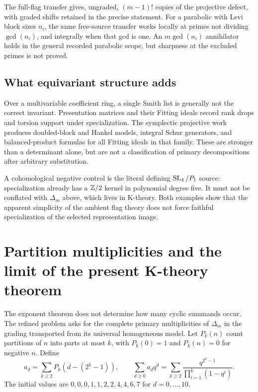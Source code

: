The full-flag transfer gives, ungraded, $(m-1)!$ copies of the projective defect, with graded shifts retained in the precise statement. For a parabolic with Levi block sizes $n_i$, the same free-source transfer works locally at primes not dividing $\gcd(n_i)$, and integrally when that gcd is one. An $m\gcd(n_i)$ annihilator holds in the general recorded parabolic scope, but sharpness at the excluded primes is not proved.

\subsection{What equivariant structure adds}
Over a multivariable coefficient ring, a single Smith list is generally not the correct invariant. Presentation matrices and their Fitting ideals record rank drops and torsion support under specialization. The symplectic projective work produces doubled-block and Hankel models, integral Schur generators, and balanced-product formulas for all Fitting ideals in that family. These are stronger than a determinant alone, but are not a classification of primary decompositions after arbitrary substitution.

A cohomological negative control is the literal defining $\operatorname{SL}_4/P_1$ source: specialization already has a $\mathbb Z/2$ kernel in polynomial degree five. It must not be conflated with $\Delta_m$ above, which lives in K-theory. Both examples show that the apparent simplicity of the ambient flag theory does not force faithful specialization of the selected representation image.


\section{Partition multiplicities and the limit of the present K-theory theorem}
The exponent theorem does not determine how many cyclic summands occur. The refined problem asks for the complete primary multiplicities of $\Delta_m$ in the grading transported from its universal homogeneous model. Let $P_k(n)$ count partitions of $n$ into parts at most $k$, with $P_k(0)=1$ and $P_k(n)=0$ for negative $n$. Define
\[
 a_d=\sum_{k\ge2}P_k(d-(2^k-1)),\qquad
 \sum_{d\ge0}a_dq^d=\sum_{k\ge2}\frac{q^{2^k-1}}{\prod_{i=1}^k(1-q^i)}.
\]
The initial values are $0,0,0,1,1,2,2,4,4,6,7$ for $d=0,\ldots,10$.

